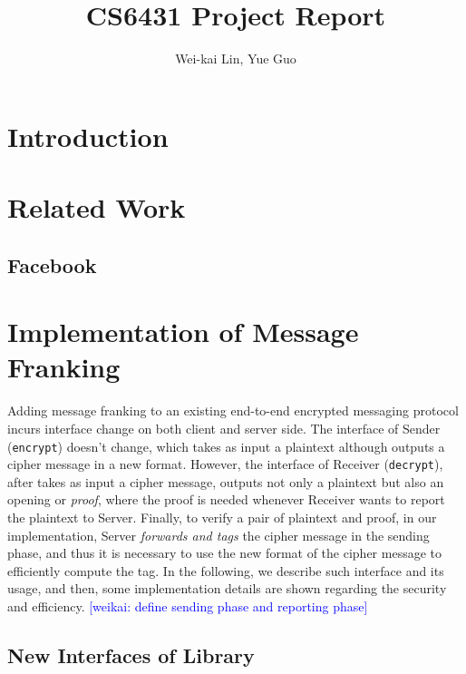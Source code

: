 \documentclass{article}
\title{CS6431 Project Report}
\author{Wei-kai Lin, Yue Guo}
\newcommand{\weikai}[1]{\textcolor{blue}{[weikai: #1]}}
\begin{document}
\maketitle

\begin{abstract}
    
\end{abstract}

\section{Introduction}





\section{Related Work}
\subsection{Facebook}


\section{Implementation of Message Franking}

Adding message franking to an existing end-to-end encrypted
messaging protocol incurs interface change on both client and server side.
The interface of Sender ({\tt encrypt}) doesn't change,
which takes as input a plaintext
although outputs a cipher message in a new format.
However, the interface of Receiver ({\tt decrypt}),
after takes as input a cipher message,
outputs not only a plaintext but also an opening or \emph{proof},
where the proof is needed 
whenever Receiver wants to report the plaintext to Server.
Finally, to verify a pair of plaintext and proof,
in our implementation,
Server \emph{forwards and tags} the cipher message in the sending phase,
and thus it is necessary to use the new format of the cipher message
to efficiently compute the tag.
In the following, we describe such interface and its usage,
and then, some implementation details are shown 
regarding the security and efficiency.
\weikai{define sending phase and reporting phase}

\subsection{New Interfaces of Library}
\end{document}

